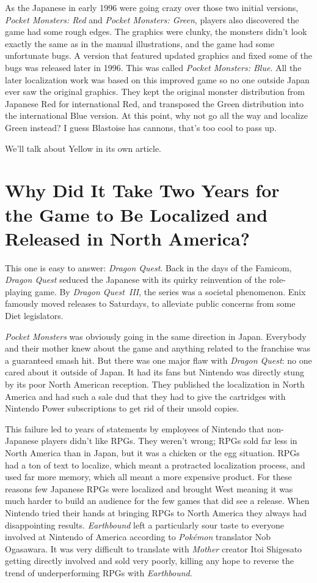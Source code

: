 \documentclass{book}
\begin{document}
As the Japanese in early 1996 were going crazy over those two initial versions, \emph{Pocket Monsters: Red} and \emph{Pocket Monsters: Green}, players also discovered the game had some rough edges. The graphics were clunky, the monsters didn’t look exactly the same as in the manual illustrations, and the game had some unfortunate bugs. A version that featured updated graphics and fixed some of the bugs was released later in 1996. This was called \emph{Pocket Monsters: Blue}. All the later localization work was based on this improved game so no one outside Japan ever saw the original graphics. They kept the original monster distribution from Japanese Red for international Red, and transposed the Green distribution into the international Blue version. At this point, why not go all the way and localize Green instead? I guess Blastoise has cannons, that’s too cool to pass up.

We’ll talk about Yellow in its own article.

\FloatBarrier\needspace{10mm}\section*{Why Did It Take Two Years for the Game to Be Localized and Released in North America?}\nopagebreak[4]

This one is easy to answer: \emph{Dragon Quest}. Back in the days of the Famicom, \emph{Dragon Quest} seduced the Japanese with its quirky reinvention of the role-playing game. By \emph{Dragon Quest III}, the series was a societal phenomenon. Enix famously moved releases to Saturdays, to alleviate public concerns from some Diet legislators.

\emph{Pocket Monsters} was obviously going in the same direction in Japan. Everybody and their mother knew about the game and anything related to the franchise was a guaranteed smash hit. But there was one major flaw with \emph{Dragon Quest}: no one cared about it outside of Japan. It had its fans but Nintendo was directly stung by its poor North American reception. They published the localization in North America and had such a sale dud that they had to give the cartridges with Nintendo Power subscriptions to get rid of their unsold copies.

This failure led to years of statements by employees of Nintendo that non-Japanese players didn’t like RPGs. They weren’t wrong; RPGs sold far less in North America than in Japan, but it was a chicken or the egg situation. RPGs had a ton of text to localize, which meant a protracted localization process, and used far more memory, which all meant a more expensive product. For these reasons few Japanese RPGs were localized and brought West meaning it was much harder to build an audience for the few games that did see a release. When Nintendo tried their hands at bringing RPGs to North America they always had disappointing results. \emph{Earthbound} left a particularly sour taste to everyone involved at Nintendo of America according to \emph{Pokémon} translator Nob Ogasawara. It was very difficult to translate with \emph{Mother} creator Itoi Shigesato getting directly involved and sold very poorly, killing any hope to reverse the trend of underperforming RPGs with \emph{Earthbound}.
\end{document}
